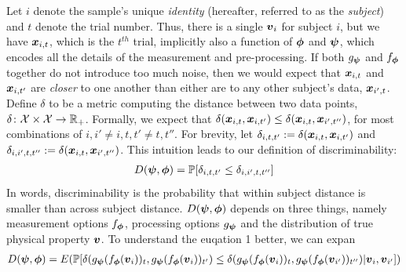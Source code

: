 \documentclass{article}
\begin{document}
Let $i$ denote the sample's unique \emph{identity} (hereafter, referred to as the \emph{subject}) and $t$ denote the trial number.  Thus, there is a single $\boldsymbol{v}_i$ for subject $i$, but we have $\boldsymbol{x}_{i,t}$, which is the $t^{th}$ trial, implicitly also a function of $\boldsymbol{\phi}$ and $\boldsymbol{\psi}$, which encodes all the details of the measurement and pre-processing. If both $g_{\boldsymbol{\psi}}$ and $f_{\boldsymbol{\phi}}$ together do not introduce too much noise, then we would expect that $\boldsymbol{x}_{i,t}$ and $\boldsymbol{x}_{i,t'}$ are \emph{closer} to one another than either are to any other subject's data, $\boldsymbol{x}_{i',t}$. Define $\delta$ to be a metric computing the distance between two data points, $\delta {\ensuremath{\colon}} \mathcal{X} \times \mathcal{X} \to \mathbb{R}_+$.  Formally, we expect that $\delta(\boldsymbol{x}_{i,t},\boldsymbol{x}_{i,t'}) \leq \delta(\boldsymbol{x}_{i,t},\boldsymbol{x}_{i',t''})$, for most combinations of $i,i'\neq i,t,t' \neq t,t''$.  
For brevity, let $\delta_{i,t,t'}:=\delta(\boldsymbol{x}_{i,t}, \boldsymbol{x}_{i,t'})$ and 
$\delta_{i,i',t,t''}:=\delta(\boldsymbol{x}_{i,t}, \boldsymbol{x}_{i',t''})$.  
This intuition leads to our definition of discriminability:
\begin{align}
	D(\boldsymbol{\psi},\boldsymbol{\phi}) = \mathbb{P}[ \delta_{i,t,t'} \leq \delta_{i,i',t,t''}]
\end{align}
In words, discriminability is the probability that within subject distance is smaller than across subject distance. $D(\boldsymbol{\psi},\boldsymbol{\phi})$ depends on three things, namely measurement options $f_{\boldsymbol{\phi}}$, processing options $g_{\boldsymbol{\psi}}$ and the distribution of true physical property $\boldsymbol{v}$. To understand the euqation 1 better, we can expan
\begin{align}
	D(\boldsymbol{\psi},\boldsymbol{\phi}) = E(\mathbb{P} [\delta(g_{\boldsymbol{\psi}} (f_{\boldsymbol{\phi}} (\boldsymbol{v}_i) )_t,g_{\boldsymbol{\psi}} (f_{\boldsymbol{\phi}} (\boldsymbol{v}_i) )_{t'}) \leq \delta(g_{\boldsymbol{\psi}} (f_{\boldsymbol{\phi}} (\boldsymbol{v}_i) )_t,g_{\boldsymbol{\psi}} (f_{\boldsymbol{\phi}} (\boldsymbol{v}_{i'}) )_{t''})|\boldsymbol{v}_i,\boldsymbol{v}_{i'}])
\end{align}
\end{document}
